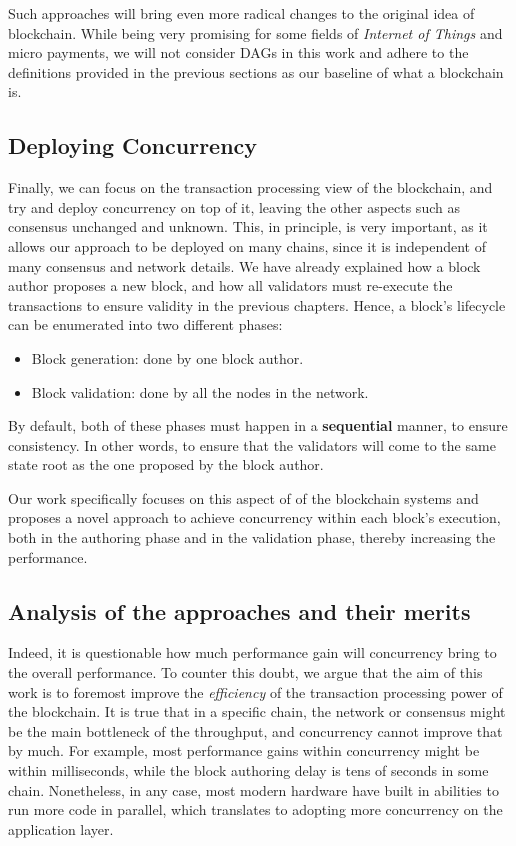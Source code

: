Such approaches will bring even more radical changes to the original idea of blockchain. While being
very promising for some fields of \textit{Internet of Things} and micro payments, we will not
consider DAGs in this work and adhere to the definitions provided in the previous sections as our
baseline of what a blockchain is.

\subsection{Deploying Concurrency}

Finally, we can focus on the transaction processing view of the blockchain, and try and deploy
concurrency on top of it, leaving the other aspects such as consensus unchanged and unknown. This,
in principle, is very important, as it allows our approach to be deployed on many chains, since it
is independent of many consensus and network details. We have already explained how a block author
proposes a new block, and how all validators must re-execute the transactions to ensure validity in
the previous chapters. Hence, a block's lifecycle can be enumerated into two different phases:

\begin{itemize}
	\item Block generation: done by one block author.
	\item Block validation: done by all the nodes in the network.
\end{itemize}

By default, both of these phases must happen in a \textbf{sequential} manner, to ensure consistency.
In other words, to ensure that the validators will come to the same state root as the one proposed
by the block author.

Our work specifically focuses on this aspect of of the blockchain systems and proposes a novel
approach to achieve concurrency within each block's execution, both in the authoring phase and in
the validation phase, thereby increasing the performance.

\subsection{Analysis of the approaches and their merits} \label{chap_bg:subsec:summary_speedup}

Indeed, it is questionable how much performance gain will concurrency bring to the overall
performance. To counter this doubt, we argue that the aim of this work is to foremost improve the
\textit{efficiency} of the transaction processing power of the blockchain. It is true that in a specific
chain, the network or consensus might be the main bottleneck of the throughput, and concurrency
cannot improve that by much. For example, most performance gains within concurrency might be within
milliseconds, while the block authoring delay is tens of seconds in some chain. Nonetheless, in any
case, most modern hardware have built in abilities to run more code in parallel, which translates to
adopting more concurrency on the application layer.

